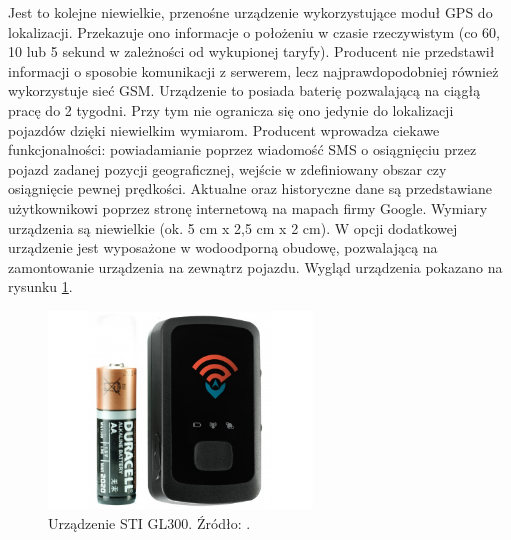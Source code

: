 \begin{itemize}
Jest to kolejne niewielkie, przenośne urządzenie wykorzystujące moduł GPS do lokalizacji. Przekazuje ono informacje o położeniu w czasie rzeczywistym (co 60, 10 lub 5 sekund w zależności od wykupionej taryfy). Producent nie przedstawił informacji o sposobie komunikacji z serwerem, lecz najprawdopodobniej również wykorzystuje sieć GSM. Urządzenie to posiada baterię pozwalającą na ciągłą pracę do 2 tygodni. Przy tym nie ogranicza się ono jedynie do lokalizacji pojazdów dzięki niewielkim wymiarom. Producent wprowadza ciekawe funkcjonalności: powiadamianie poprzez wiadomość SMS o osiągnięciu przez pojazd zadanej pozycji geograficznej, wejście w zdefiniowany obszar czy osiągnięcie pewnej prędkości. Aktualne oraz historyczne dane są przedstawiane użytkownikowi poprzez stronę internetową na mapach firmy Google. Wymiary urządzenia są niewielkie (ok. 5 cm x 2,5 cm x 2 cm).  W opcji dodatkowej urządzenie jest wyposażone w wodoodporną obudowę, pozwalającą na zamontowanie urządzenia na zewnątrz pojazdu. Wygląd urządzenia pokazano na rysunku \ref{fig:image_sti_gl300}.
\begin{figure}[h]
	\centering
	\includegraphics[width=7cm]{img/introduction/sti_gl300.jpg}
	\caption{Urządzenie STI GL300. Źródło: \cite{gl300}.}
	\label{fig:image_sti_gl300}
\end{figure}
\end{itemize}